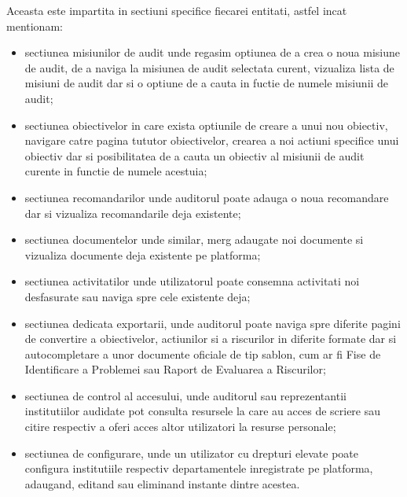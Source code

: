 	Aceasta este impartita in sectiuni specifice fiecarei entitati, astfel incat mentionam:
	\begin{itemize}
		\item  sectiunea misiunilor de audit unde regasim optiunea de a crea o noua misiune de audit, de a naviga la misiunea de audit selectata curent, vizualiza lista de misiuni de audit dar si o optiune de a cauta in fuctie de numele misiunii de audit; 
		
		\item sectiunea obiectivelor in care exista optiunile de creare a unui nou obiectiv, navigare catre pagina tututor obiectivelor, crearea a noi actiuni specifice unui obiectiv dar si posibilitatea de a cauta un obiectiv al misiunii de audit curente in functie de numele acestuia;
		
		\item sectiunea recomandarilor unde auditorul poate adauga o noua recomandare dar si vizualiza recomandarile deja existente;
		
		\item sectiunea documentelor unde similar, merg adaugate noi documente si vizualiza documente deja existente pe platforma;
		
		\item sectiunea activitatilor unde utilizatorul poate consemna activitati noi desfasurate sau naviga spre cele existente deja;
		
		\item sectiunea dedicata exportarii, unde auditorul poate naviga spre diferite pagini de convertire a obiectivelor, actiunilor si a riscurilor in diferite formate dar si autocompletare a unor documente oficiale de tip sablon, cum ar fi Fise de Identificare a Problemei sau Raport de Evaluarea a Riscurilor;
		
		\item sectiunea de control al accesului, unde auditorul sau reprezentantii institutiilor audidate pot consulta resursele la care au acces de scriere sau citire respectiv a oferi acces altor utilizatori la resurse personale;
		
		\item sectiunea de configurare, unde un utilizator cu drepturi elevate poate configura institutiile respectiv departamentele inregistrate pe platforma, adaugand, editand sau eliminand instante dintre acestea.
		
		
		
		

	\end{itemize}
